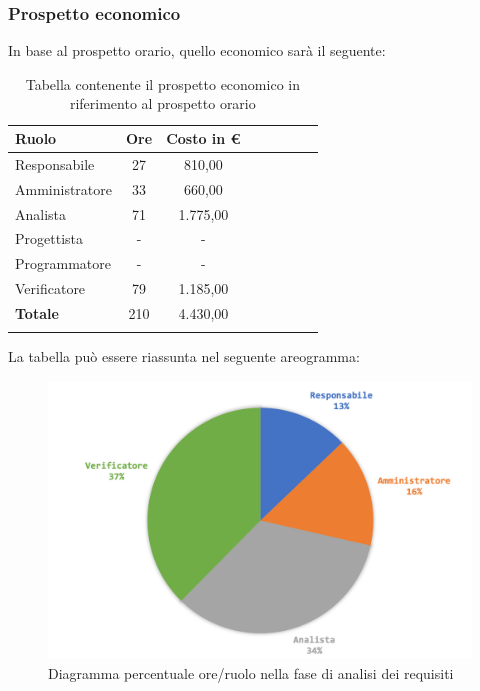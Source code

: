 			\subsubsection{Prospetto economico}
			In base al prospetto orario, quello economico sarà il seguente: 
			
			\begin{longtable}{|l|c|c|c|c|c|c|c|}
				\hline
				\rowcolor{lighter-grayer}
				\textbf{Ruolo} & \textbf{Ore} & \textbf{Costo in €} \\
				\hline
				\endfirsthead
				
				\hline
				Responsabile & 27 & 810,00\\
				\hline
				\hline
				Amministratore & 33 & 660,00\\
				\hline
				\hline
				Analista & 71 & 1.775,00\\
				\hline
				\hline
				Progettista & - & -\\
				\hline
				\hline
				Programmatore & - & -\\
				\hline
				\hline
				Verificatore & 79 & 1.185,00\\
				\hline
				\textbf{Totale} & 210 & 4.430,00\\
				\hline
				\caption{Tabella contenente il prospetto economico in riferimento al prospetto orario}
			\end{longtable}
			\pagebreak
		
			La tabella può essere riassunta nel seguente areogramma:
			\begin{figure}[H]
				\centering
				\includegraphics[width=0.8\linewidth]{./images/preventivo/analisi2.png}
				\caption{Diagramma percentuale ore/ruolo nella fase di analisi dei requisiti}
				\label{fig:diagramma costi ruolo fase analisi dei requisiti}
			\end{figure}
		
